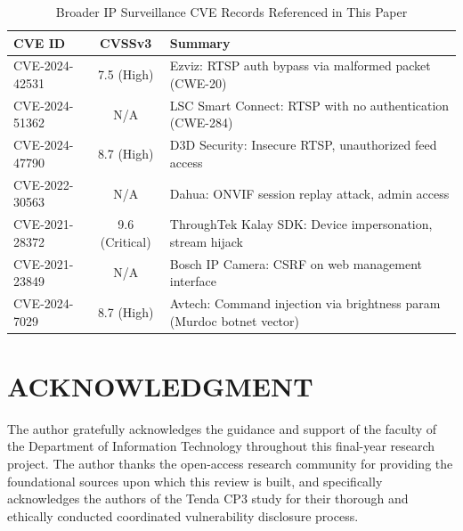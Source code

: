 \documentclass[letterpaper, 10pt, conference]{ieeeconf}
\begin{document}
\begin{table}[h]
\renewcommand{\arraystretch}{1.2}
\caption{Broader IP Surveillance CVE Records Referenced in This Paper}
\label{tab:broader_cve}
\centering
\small
\begin{tabular}{p{2.0cm} c p{3.8cm}}
\toprule
\textbf{CVE ID} & \textbf{CVSSv3} & \textbf{Summary} \\
\midrule
CVE-2024-42531  & 7.5 (High)     & Ezviz: RTSP auth bypass via malformed packet (CWE-20) \\
\midrule
CVE-2024-51362  & N/A            & LSC Smart Connect: RTSP with no authentication (CWE-284) \\
\midrule
CVE-2024-47790  & 8.7 (High)     & D3D Security: Insecure RTSP, unauthorized feed access \\
\midrule
CVE-2022-30563  & N/A            & Dahua: ONVIF session replay attack, admin access \\
\midrule
CVE-2021-28372  & 9.6 (Critical) & ThroughTek Kalay SDK: Device impersonation, stream hijack \\
\midrule
CVE-2021-23849  & N/A            & Bosch IP Camera: CSRF on web management interface \\
\midrule
CVE-2024-7029   & 8.7 (High)     & Avtech: Command injection via brightness param (Murdoc botnet vector) \\
\bottomrule
\end{tabular}
\end{table}

\section*{ACKNOWLEDGMENT}

The author gratefully acknowledges the guidance and support of the
faculty of the Department of Information Technology throughout this
final-year research project. The author thanks the open-access
research community for providing the foundational sources upon which
this review is built, and specifically acknowledges the authors of
the Tenda CP3 study for their thorough and ethically conducted
coordinated vulnerability disclosure process.
\end{document}
